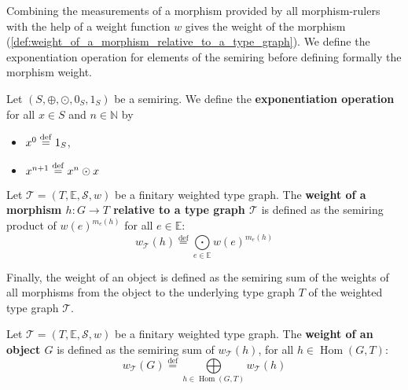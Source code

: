 Combining the measurements of a morphism provided by all morphism-rulers with the help of a weight function $w$ gives the weight of the morphism (\autoref{def:weight_of_a_morphism_relative_to_a_type_graph}).
 We define the exponentiation operation for elements of the semiring before defining formally the morphism weight.
\begin{notation} 
    \label{wfs:def:exponentiation}
Let $(S, \oplus, \odot, 0_S, 1_S)$ be a semiring. We define the \textbf{exponentiation operation} for all $x \in S$ and $n \in \mathbb{N}$ by
   \begin{itemize}
        \item $ x^0 \overset{\operatorname{def}}{=} 1_S$,
        \item $x^{n+1} \overset{\operatorname{def}}{=} x^n \odot x$
   \end{itemize}
\end{notation}
\begin{definition} 
    \label{def:weight_of_a_morphism_relative_to_a_type_graph}
        Let $\mathcal{T}=(T,\mathbb{E},\mathcal{S},w)$ be a finitary weighted type graph.
         The \textbf{weight of a morphism $h: G \rightarrow T$ relative to a type graph $\mathcal{T}$} is defined as the semiring product of $w(e)^{m_e(h)}$ for all $e \in \mathbb{E}$:
        \[  w_{\mathcal{T}}(h) \overset{\operatorname{def}}{=} \underset{e \in \mathbb{E}}{\bigodot} 
                w(e)^{m_e(h)} \]
\end{definition}
Finally, the weight of an object is defined as the semiring sum of the weights of all morphisms from the object to the underlying type graph $T$ of the weighted type graph $\mathcal{T}$.
\begin{definition}
    \label{def:weight_of_an_object_relative_to_a_type_graph}
       Let $\mathcal{T}=(T,\mathbb{E},\mathcal{S},w)$ be a finitary weighted type graph. The \textbf{weight of an object \( G \)} is defined as the semiring sum of $w_\mathcal{T}(h)$, for all \( h \in \operatorname{Hom}(G,T) \):
        \[ w_\mathcal{T}(G) \overset{\operatorname{def}}{=} \underset{h \in \operatorname{Hom}(G,T)}{\bigoplus}  w_\mathcal{T}(h) \]
\end{definition}


